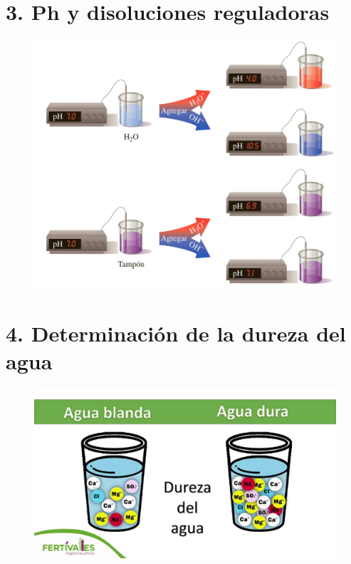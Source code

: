 \documentclass[12pt,letterpaper,oneside,openany,spanish]{book}
\begin{document}
\chapter[Práctica 3]{3. Ph y disoluciones reguladoras}
\thispagestyle{empty}
\vspace{1cm}
\begin{figure}[h]
    \centering
    \hspace*{-0.2cm}
    \includegraphics[width=1\textwidth]{prac3/portada.jpg}
    \hspace*{-0.4cm}
\end{figure}


\chapter[Práctica 4]{4. Determinación de la dureza del agua}
\thispagestyle{empty}
\vspace{1cm}
\begin{figure}[h]
    \centering
    \hspace*{-0.2cm}
    \includegraphics[width=1\textwidth]{fotos/dureza.jpg}
    \hspace*{-0.4cm}
\end{figure}

\end{document}
